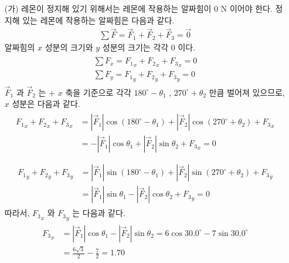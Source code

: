 \documentclass[floatfix,nofootinbib,superscriptaddress,fleqn,preprint]{revtex4}
\begin{document}
\begin{itemize}
  \item[(가)] 레몬이 정지해 있기 위해서는 레몬에 작용하는 알짜힘이
  0 N 이어야 한다. 정지해 있는 레몬에 작용하는 알짜힘은 다음과 같다.
  \begin{align}
    \sum\vec{F}=\vec{F}_1 + \vec{F}_2 + \vec{F}_3 = \vec{0}
  \end{align}
  알짜힘의 $x$ 성분의 크기와 $y$ 성분의 크기는 각각 0 이다.
  \begin{align}
    \begin{split}
      \sum F_x = {F_1}_x + {F_2}_x + {F_3}_x = 0  \\
      \sum F_y = {F_1}_y + {F_2}_y + {F_3}_y = 0  
    \end{split}
  \end{align}
  $\vec{F}_1$ 과 $\vec{F}_2$ 는 + $x$ 축을 기준으로 각각
  $180^\circ-\theta_1$ , $270^\circ+\theta_2$ 만큼 벌어져 있으므로,
  $x$ 성분은 다음과 같다.
  \begin{align}
    \begin{split}
      {F_1}_x + {F_2}_x + {F_3}_x 
      &= |\vec{F}_1|\cos{(180^\circ-\theta_1)}
      +|\vec{F}_2|\cos{(270^\circ+\theta_2)} + {F_3}_x  \\
      &=-|\vec{F}_1|\cos{\theta_1}
      +|\vec{F}_2|\sin{\theta_2} + {F_3}_x = 0  \\
    \end{split}  
  \end{align}
  \begin{align}
    \begin{split}
      {F_1}_y + {F_2}_y + {F_3}_y 
      &= |\vec{F}_1|\sin{(180^\circ-\theta_1)}
      +|\vec{F}_2|\sin{(270^\circ+\theta_2)} + {F_3}_y  \\
      &= |\vec{F}_1|\sin{\theta_1}
      -|\vec{F}_2|\cos{\theta_2} + {F_3}_y=0
    \end{split}
  \end{align}
  따라서, ${F_3}_x$ 와 ${F_3}_y$ 는 다음과 같다.
  \begin{align}
    \begin{split}
      {F_3}_x&=|\vec{F}_1|\cos{\theta_1}-|\vec{F}_2|\sin{\theta_2} 
      =6\cos{30.0^\circ}-7\sin{30.0^\circ}  \\
      &=\frac{6\sqrt{3}}{2}-\frac{7}{2} = 1.70 
    \end{split}
  \end{align}
  \begin{align}
    \begin{split}

\end{split}
\end{align}
\end{itemize}
\end{document}
